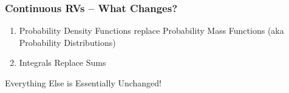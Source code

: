 \documentclass[handout]{beamer}
\date{Lecture \# 11}
\begin{document}
 


\begin{frame}[plain]
	\titlepage 
	

\end{frame} 


\begin{frame}
\frametitle{Continuous RVs -- What Changes?}
	\begin{enumerate}
\item Probability Density Functions replace Probability Mass Functions (aka Probability Distributions)
\item Integrals Replace Sums
\end{enumerate}
\begin{alertblock}{Everything Else is Essentially Unchanged!}\end{alertblock}


\end{frame}

\end{document}
